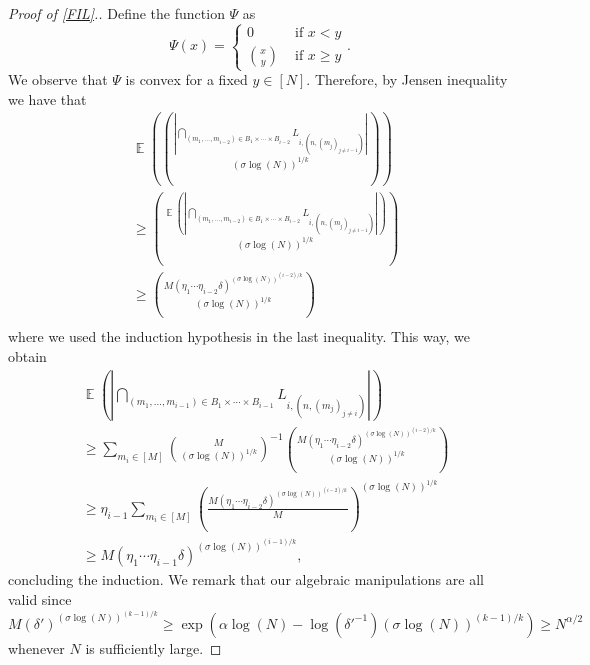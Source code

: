 \documentclass[letter, 11pt]{article}
\theoremstyle{plain} %
\theoremstyle{definition} %
\theoremstyle{plain}
\theoremstyle{plain}
\newcommand{\1}{\mathbbm{1}}
\newcommand{\E}{\operatorname{\mathbb{E}}}
\begin{document}
\begin{proof}[Proof of \cref{FIL}.]
    Define the function $\Psi$ as
    $$
    \Psi(x) =\begin{cases}
        0 & \text{ if } x<y\\
        \binom{x}{y} & \text{ if }x\geq y
    \end{cases} .
    $$
    We observe that $\Psi$ is convex for a fixed $y\in [N]$. Therefore, by Jensen inequality we have that
    \begin{align*}
        &\E\left( \binom{\left| \bigcap_{(m_1,\ldots,m_{i-2})\in  B_1\times \cdots \times B_{i-2} } L_{i,(n,(m_j)_{j\neq i-1 })} \right|}{(\sigma \log(N))^{1/k}}  \right)\\
        &\geq  \binom{\E\left(\left| \bigcap_{(m_1,\ldots,m_{i-2})\in  B_1\times \cdots \times B_{i-2} } L_{i,(n,(m_j)_{j\neq i-1 })} \right| \right)}{(\sigma \log(N))^{1/k}} \\
        &\geq  \binom{M (\eta_1\cdots\eta_{i-2}\delta)^{(\sigma \log(N))^{(i-2)/k}}}{(\sigma \log(N))^{1/k}} \\
    \end{align*}
    where we used the induction hypothesis in the last inequality. This way, we obtain 
    \begin{align*}
        &\E\left( \left| \bigcap_{(m_1,\ldots,m_{i-1})\in  B_1\times \cdots \times B_{i-1} } L_{i,(n,(m_j)_{j\neq i })} \right| \right) \\
        &\geq  \sum_{m_i\in [M]} \binom{M}{(\sigma \log(N))^{1/k}}^{-1}\binom{M (\eta_1\cdots\eta_{i-2}\delta)^{(\sigma \log(N))^{(i-2)/k}}}{(\sigma \log(N))^{1/k}}\\
        &\geq \eta_{i-1} \sum_{m_i\in [M]} \left(\frac{M (\eta_1\cdots\eta_{i-2}\delta)^{(\sigma \log(N))^{(i-2)/k}}}{M} \right)^{(\sigma \log(N))^{1/k}}\\
        &\geq M (\eta_1\cdots\eta_{i-1}\delta)^{(\sigma \log(N))^{(i-1)/k}},
    \end{align*}
    concluding the induction. We remark that our algebraic manipulations are all valid since $M (\delta')^{(\sigma \log(N))^{(k-1)/k}}\geq\exp(\alpha \log(N)- \log(\delta'^{-1}) (\sigma\log(N))^{(k-1)/k})\geq N^{\alpha/2}$ whenever $N$ is sufficiently large.
    

\end{proof}
\end{document}
